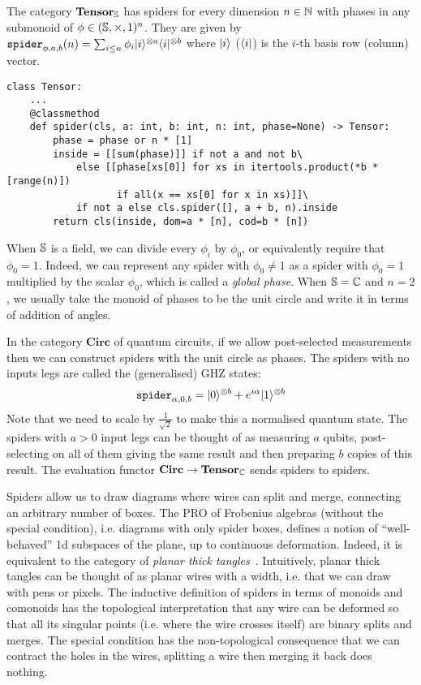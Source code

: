 \begin{example}\label{example:tensor-spider}
The category $\mathbf{Tensor}_\S$ has spiders for every dimension $n \in \N$ with phases in any submonoid of $\phi \in (\S, \times, 1)^n$.
They are given by $\spider_{\phi, a, b}(n) = \sum_{i \leq n} \phi_i \ket{i}^{\otimes a} \bra{i}^{\otimes b}$ where $\ket{i}$ ($\bra{i}$) is the $i$-th basis row (column) vector.

\begin{verbatim}
class Tensor:
    ...
    @classmethod
    def spider(cls, a: int, b: int, n: int, phase=None) -> Tensor:
        phase = phase or n * [1]
        inside = [[sum(phase)]] if not a and not b\
            else [[phase[xs[0]] for xs in itertools.product(*b * [range(n)])
                   if all(x == xs[0] for x in xs)]]\
            if not a else cls.spider([], a + b, n).inside
        return cls(inside, dom=a * [n], cod=b * [n])
\end{verbatim}

When $\S$ is a field, we can divide every $\phi_i$ by $\phi_0$, or equivalently require that $\phi_0 = 1$.
Indeed, we can represent any spider with $\phi_0 \neq 1$ as a spider with $\phi_0 = 1$ multiplied by the scalar $\phi_0$, which is called a \emph{global phase}.
When $\S = \C$ and $n = 2$, we usually take the monoid of phases to be the unit circle and write it in terms of addition of angles.
\end{example}

\begin{example}\label{example:circuit-spider}
In the category $\mathbf{Circ}$ of quantum circuits, if we allow post-selected measurements then we can construct spiders with the unit circle as phases.
The spiders with no inputs legs are called the (generalised) GHZ states:
$$
\spider_{\alpha, 0, b} = \ket{0}^{\otimes b} + e^{i \alpha} \ket{1}^{\otimes b}
$$
Note that we need to scale by $\frac{1}{\sqrt{2}}$ to make this a normalised quantum state.
The spiders with $a > 0$ input legs can be thought of as measuring $a$ qubits, post-selecting on all of them giving the same result and then preparing $b$ copies of this result.
The evaluation functor $\mathbf{Circ} \to \mathbf{Tensor}_\C$ sends spiders to spiders.
\end{example}

Spiders allow us to draw diagrams where wires can split and merge, connecting an arbitrary number of boxes.
The PRO of Frobenius algebras (without the special condition), i.e. diagrams with only spider boxes, defines a notion of ``well-behaved'' 1d subspaces of the plane, up to continuous deformation.
Indeed, it is equivalent to the category of \emph{planar thick tangles}~\cite{Lauda05}.
Intuitively, planar thick tangles can be thought of as planar wires with a width, i.e. that we can draw with pens or pixels.
The inductive definition of spiders in terms of monoids and comonoids has the topological interpretation that any wire can be deformed so that all its singular points (i.e. where the wire crosses itself) are binary splits and merges.
The special condition has the non-topological consequence that we can contract the holes in the wires, splitting a wire then merging it back does nothing.

